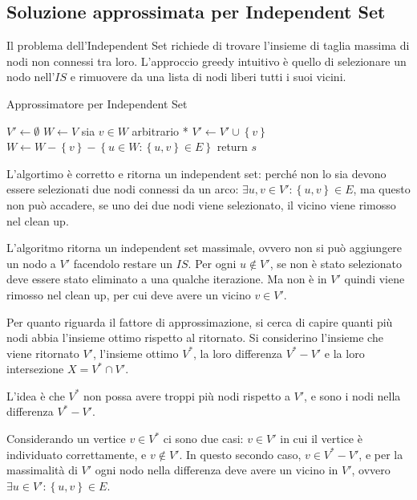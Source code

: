 \subsection{Soluzione approssimata per Independent Set}

Il problema dell'Independent Set richiede di trovare l'insieme di taglia massima di nodi non connessi tra loro.
L'approccio greedy intuitivo è quello di selezionare un nodo nell'$IS$ e rimuovere da una lista di nodi liberi tutti i suoi vicini.
\begin{algorithm}[H]
\caption{Approssimatore per Independent Set}\label{alg:is_approx}
\begin{algorithmic}[1]
        \State $V' \gets \emptyset$
        \State $W \gets V$
            \State * sia $v \in W$ arbitrario *
            \State $V' \gets V' \cup \left\{ v \right\}$
            \State $W \gets W - \left\{ v \right\}
            - \left\{ u \in W : \left\{ u,v \right\} \in E \right\}
            $
        \EndWhile
        \State return $s$
    \EndProcedure
\end{algorithmic}
\end{algorithm}
L'algortimo è corretto e ritorna un independent set: perché non lo sia devono essere selezionati due nodi connessi da un arco: $
\exists u, v \in V' :
\left\{ u, v \right\} \in E
$, ma questo non può accadere, se uno dei due nodi viene selezionato, il vicino viene rimosso nel clean up.

L'algoritmo ritorna un independent set massimale, ovvero non si può aggiungere un nodo a $V'$ facendolo restare un $IS$.
Per ogni $u \notin V'$, se non è stato selezionato deve essere stato eliminato a una qualche iterazione. Ma non è in $V'$ quindi viene rimosso nel clean up, per cui deve avere un vicino $v \in V'$.

Per quanto riguarda il fattore di approssimazione,
si cerca di capire quanti più nodi abbia l'insieme ottimo rispetto al ritornato.
Si considerino l'insieme
che viene ritornato
$V'$,
l'insieme ottimo 
$V^*$,
la loro differenza $
V^* - V'
$
e la loro intersezione
$X = V^* \cap V'$.

L'idea è che $V^*$ non possa avere troppi più nodi rispetto a $V'$, e sono i nodi nella differenza $
V^* - V'
$.

Considerando un vertice $v \in V^*$ ci sono due casi:
$v \in V'$ in cui il vertice è individuato correttamente, e 
$v \notin V'$.
In questo secondo caso, $v \in V^* - V'$, e per la massimalità di $V'$ ogni nodo nella differenza deve avere un vicino in $V'$, ovvero $
\exists u \in V' :
\left\{ u, v \right\} \in E
$.

